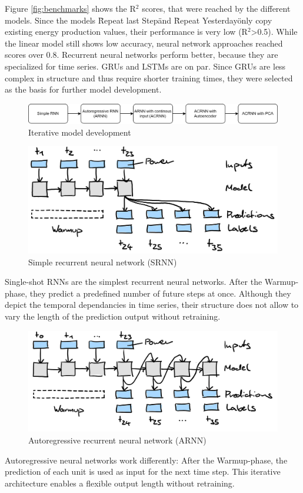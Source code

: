 \documentclass[11pt,table]{article}
\begin{document}
Figure \ref{fig:benchmarks} shows the R$^2$ scores, that were reached by the different models. Since the models \" Repeat last Step\" and \" Repeat Yesterday\" only copy existing energy production values, their performance is very low (R$^2$>0.5). While the linear model still shows low accuracy, neural network approaches reached scores over 0.8. Recurrent neural networks perform better, because they are specialized for time series. GRUs and LSTMs are on par. Since GRUs are less complex in structure and thus require shorter training times, they were selected as the basis for further model development.

\begin{figure}[H]
	\centering
	\includegraphics[scale=1]{Figures/modelEvolution.png}
	\caption{Iterative model development}
	\label{fig:modelEvo}
\end{figure}

\begin{figure}[H]
	\centering
	\includegraphics[scale=1]{Figures/SRNN.png}
	\caption{Simple recurrent neural network (SRNN)}
	\label{fig:SRNN}
\end{figure}
Single-shot RNNs are the simplest recurrent neural networks. After the Warmup-phase, they predict a predefined number of future steps at once. Although they depict the temporal dependancies in time series, their structure does not allow to vary the length of the prediction output without retraining.
\begin{figure}[H]
	\centering
	\includegraphics[scale=1]{Figures/ARNN.png}
	\caption{Autoregressive recurrent neural network (ARNN)}
	\label{fig:ARNN}
\end{figure}
Autoregressive neural networks work differently: After the Warmup-phase, the prediction of each unit is used as input for the next time step. This iterative architecture enables a flexible output length without retraining.\\
\end{document}
